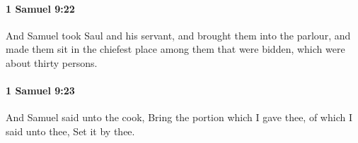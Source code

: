		\paragraph{1 Samuel 9:22} %
			\label{1SAMUEL-9-22}

			And Samuel took Saul and his servant, and brought them into the parlour, and made them sit in the chiefest place among them that were bidden, which were about thirty persons.


		\paragraph{1 Samuel 9:23} %
			\label{1SAMUEL-9-23}

			And Samuel said unto the cook, Bring the portion which I gave thee, of which I said unto thee, Set it by thee.


